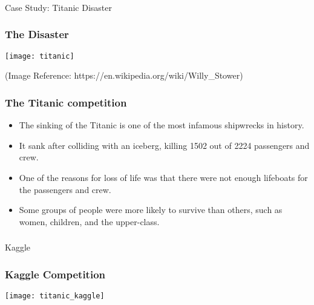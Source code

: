 \begin{frame}[fragile]\frametitle{}
\begin{center}
{\Large Case Study: Titanic Disaster}

\end{center}
\end{frame}

\begin{frame}[fragile]\frametitle{The Disaster}
\begin{center}
\texttt{[image: titanic]}
\end{center}
\tiny{(Image Reference: https://en.wikipedia.org/wiki/Willy\_Stower)}
\end{frame}

\begin{frame}[fragile]\frametitle{The Titanic competition}
\begin{itemize}
\item The sinking of the Titanic is one of the most infamous shipwrecks in history.
\item It sank after colliding with an iceberg, killing 1502 out of 2224 passengers and crew.
\item One of the reasons for loss of life was that there were not enough lifeboats for the passengers and crew. 
\item Some groups of people were more likely to survive than others, such as women, children, and the upper-class.
\end{itemize}
\end{frame}

\begin{frame}[fragile]\frametitle{}
\begin{center}
{\Large Kaggle}
\end{center}
\end{frame}


\begin{frame}[fragile]\frametitle{Kaggle Competition}
\begin{center}
\texttt{[image: titanic\_kaggle]}
\end{center}
\end{frame}

